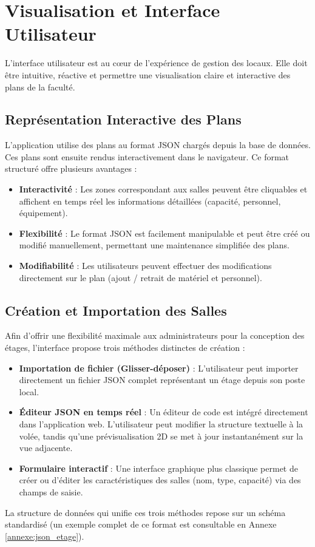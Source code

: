\chapter{Visualisation et Interface Utilisateur}

L'interface utilisateur est au cœur de l'expérience de gestion des locaux. Elle doit être intuitive, réactive et permettre une visualisation claire et interactive des plans de la faculté.

\section{Représentation Interactive des Plans}
L'application utilise des plans au format JSON chargés depuis la base de données. Ces plans sont ensuite rendus interactivement dans le navigateur. Ce format structuré offre plusieurs avantages :
\begin{itemize}
    \item \textbf{Interactivité} : Les zones correspondant aux salles peuvent être cliquables et affichent en temps réel les informations détaillées (capacité, personnel, équipement).
    \item \textbf{Flexibilité} : Le format JSON est facilement manipulable et peut être créé ou modifié manuellement, permettant une maintenance simplifiée des plans.
    \item \textbf{Modifiabilité} : Les utilisateurs peuvent effectuer des modifications directement sur le plan (ajout / retrait de matériel et personnel).
\end{itemize}

\section{Création et Importation des Salles}
Afin d'offrir une flexibilité maximale aux administrateurs pour la conception des étages, l'interface propose trois méthodes distinctes de création :
\begin{itemize}
    \item \textbf{Importation de fichier (Glisser-déposer)} : L'utilisateur peut importer directement un fichier JSON complet représentant un étage depuis son poste local.
    \item \textbf{Éditeur JSON en temps réel} : Un éditeur de code est intégré directement dans l'application web. L'utilisateur peut modifier la structure textuelle à la volée, tandis qu'une prévisualisation 2D se met à jour instantanément sur la vue adjacente.
    \item \textbf{Formulaire interactif} : Une interface graphique plus classique permet de créer ou d'éditer les caractéristiques des salles (nom, type, capacité) via des champs de saisie.
\end{itemize}
La structure de données qui unifie ces trois méthodes repose sur un schéma standardisé (un exemple complet de ce format est consultable en Annexe \ref{annexe:json_etage}).

